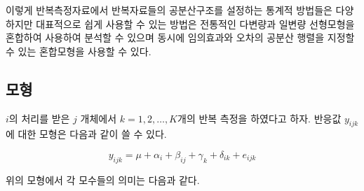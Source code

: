 \documentclass[
]{book}
\theoremstyle{definition}
\theoremstyle{definition}
\theoremstyle{definition}
\theoremstyle{remark}
\begin{document}
이렇게 반복측정자료에서 반복자료들의 공분산구조를 설정하는 통계적 방법들은 다양하지만 대표적으로 쉽게 사용할 수 있는 방법은 전통적인 다변량과 일변량 선형모형을 혼합하여 사용하여 분석할 수 있으며 동시에 임의효과와 오차의 공분산 행렬을 지정할 수 있는 혼합모형을 사용할 수 있다.

\hypertarget{uxbaa8uxd615}{%
\subsection{모형}\label{uxbaa8uxd615}}

\(i\)의 처리를 받은 \(j\) 개체에서 \(k=1,2,\dots,K\)개의 반복 측정을 하였다고 하자. 반응값 \(y_{ijk}\) 에 대한 모형은 다음과 같이 쓸 수 있다.

\begin{equation}
 y_{ijk} = \mu + \alpha_i + \beta_{ij} + \gamma_k + \delta_{ik} + e_{ijk} 
 \label{eq:repeatmodel0}
 \end{equation}

위의 모형에서 각 모수들의 의미는 다음과 같다.
\end{document}
